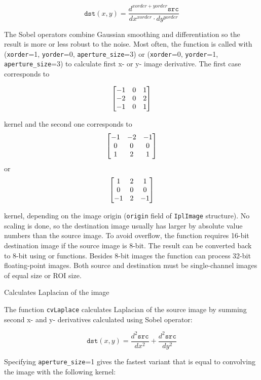 \[
\texttt{dst}(x,y) = \frac{d^{xorder+yorder} \texttt{src}}{dx^{xorder} \cdot dy^{yorder}}
\]

The Sobel operators combine Gaussian smoothing and differentiation so the result is more or less robust to the noise. Most often, the function is called with (\texttt{xorder}=1, \texttt{yorder}=0, \texttt{aperture\_size}=3) or (\texttt{xorder}=0, \texttt{yorder}=1, \texttt{aperture\_size}=3) to calculate first x- or y- image derivative. The first case corresponds to

\[ \begin{bmatrix} -1 & 0 & 1\\ -2 & 0 & 2\\ -1 & 0 & 1 \end{bmatrix}
\]

kernel and the second one corresponds to
\[ \begin{bmatrix} -1 & -2 & -1\\ 0 & 0 & 0\\ 1 & 2 & 1 \end{bmatrix}
\]
or
\[ \begin{bmatrix} 1 & 2 & 1\\ 0 & 0 & 0\\ -1 & 2 & -1 \end{bmatrix}
\]

kernel, depending on the image origin (\texttt{origin} field of
\texttt{IplImage} structure). No scaling is done, so the destination image
usually has larger by absolute value numbers than the source image. To
avoid overflow, the function requires 16-bit destination image if the
source image is 8-bit. The result can be converted back to 8-bit using
 or  functions. Besides 8-bit images
the function can process 32-bit floating-point images. Both source and
destination must be single-channel images of equal size or ROI size.

\label{Laplace}
\label{Laplace}
Calculates Laplacian of the image

\begin{description}
\end{description}

The function \texttt{cvLaplace} calculates Laplacian of the source image by summing second x- and y- derivatives calculated using Sobel operator:

\[
\texttt{dst}(x,y) = \frac{d^2 \texttt{src}}{dx^2} + \frac{d^2 \texttt{src}}{dy^2}
\]

Specifying \texttt{aperture\_size}=1 gives the fastest variant that is equal to convolving the image with the following kernel:


